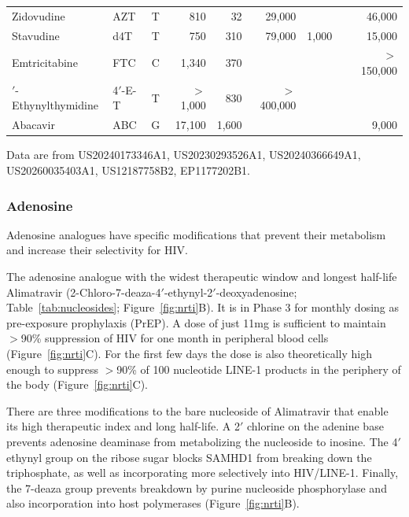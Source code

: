 \documentclass[11pt,twocolumn,twoside]{extarticle}
\begin{document}
\begin{table}[!t]
\begin{tabular}{@{}>{\raggedright\arraybackslash}p{6.05cm} l c r r r r r r@{}}
Zidovudine & AZT & T & 810 & 32 & 29,000 &  &  & 46,000 \\
Stavudine & d4T & T & 750 & 310 & 79,000 & 1,000 &  & 15,000 \\
Emtricitabine & FTC & C & 1,340 & 370 &  &  &  & $>$150,000 \\
4$'$-Ethynylthymidine & 4$'$-E-T & T & $>$1,000 & 830 & $>$400,000 &  &  &  \\
Abacavir & ABC & G & 17,100 & 1,600 &  &  &  & 9,000 \\
\bottomrule
\end{tabular}
\par\vspace{0.35em}
{\raggedright\footnotesize Data are from US20240173346A1, US20230293526A1, US20240366649A1, US20260035403A1, US12187758B2, EP1177202B1\cite{raheem,kawamoto,kodama,takamatsu,lin,nitanda,hachiya,parkin,ohrui,nakata,haraguchi,yangpol,baldwin,callebaut}.\par}
\end{table}

\subsubsection{Adenosine}
Adenosine analogues have specific modifications that prevent their metabolism and increase their selectivity for HIV.

The adenosine analogue with the widest therapeutic window and longest half-life Alimatravir (2-Chloro-7-deaza-4$'$-ethynyl-2$'$-deoxyadenosine; Table~\ref{tab:nucleosides}; Figure~\ref{fig:nrti}B)\cite{raheem,michailidis}. It is in Phase 3 for monthly dosing as pre-exposure prophylaxis (PrEP). A dose of just 11mg is sufficient to maintain $>$90\% suppression of HIV for one month in peripheral blood cells (Figure~\ref{fig:nrti}C). For the first few days the dose is also theoretically high enough to suppress $>$90\% of 100 nucleotide LINE-1 products in the periphery of the body (Figure~\ref{fig:nrti}C).

There are three modifications to the bare nucleoside of Alimatravir that enable its high therapeutic index and long half-life. A 2$'$ chlorine on the adenine base prevents adenosine deaminase from metabolizing the nucleoside to inosine\cite{raheem}. The 4$'$ ethynyl group on the ribose sugar blocks SAMHD1 from breaking down the triphosphate, as well as incorporating more selectively into HIV/LINE-1\cite{michailidis}. Finally, the 7-deaza group prevents breakdown by purine nucleoside phosphorylase and also incorporation into host polymerases (Figure~\ref{fig:nrti}B)\cite{raheem}.
\end{document}
